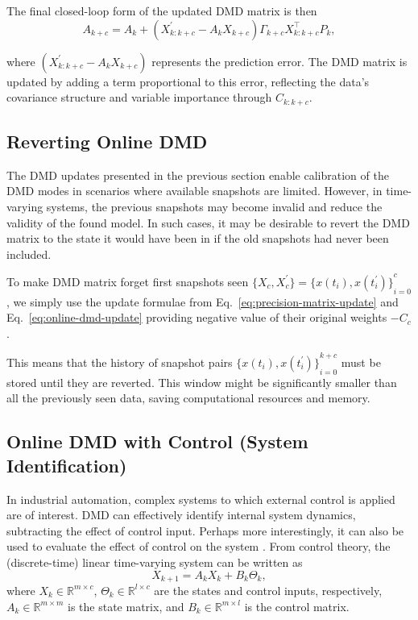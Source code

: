 The final closed-loop form of the updated DMD matrix is then
\begin{equation}\label{eq:online-dmd-update}
    A_{k+c} = A_k + (X^\prime_{k : k+c} - A_k X_{k+c}) \Gamma_{k+c} X_{k : k+c}^\top P_k,
\end{equation}

where \((X^\prime_{k : k+c} - A_k X_{k+c})\) represents the prediction error. The DMD matrix is updated by adding a term proportional to this error, reflecting the data's covariance structure and variable importance through \(C_{k: k + c}\).

\subsection{Reverting Online DMD}
The DMD updates presented in the previous section enable calibration of the DMD modes in scenarios where available snapshots are limited. However, in time-varying systems, the previous snapshots may become invalid and reduce the validity of the found model. In such cases, it may be desirable to revert the DMD matrix to the state it would have been in if the old snapshots had never been included.

To make DMD matrix forget first snapshots seen \( \{X_{c}, X^\prime_{c}\} = {\{x(t_i), x(t_i^\prime )\}}^c_{i=0}\), we simply use the update formulae from Eq.~\eqref{eq:precision-matrix-update} and Eq.~\eqref{eq:online-dmd-update} providing negative value of their original weights \(-C_{c}\).

This means that the history of snapshot pairs \({\{x(t_i), x(t_i^\prime )\}}^{k+c}_{i=0}\) must be stored until they are reverted. This window might be significantly smaller than all the previously seen data, saving computational resources and memory.


\subsection{Online DMD with Control (System Identification)}
In industrial automation, complex systems to which external control is applied are of interest. DMD can effectively identify internal system dynamics, subtracting the effect of control input. Perhaps more interestingly, it can also be used to evaluate the effect of control on the system \citep{Proctor2016}. From control theory, the (discrete-time) linear time-varying system can be written as
\begin{equation}\label{eq:linear-system}
    X_{k+1} = A_k X_{k} + B_k \Theta_{k},
\end{equation}
where \(X_k \in \mathbb{R}^{m \times c}\), \(\Theta_k \in \mathbb{R}^{l \times c}\) are the states and control inputs, respectively, \(A_k \in \mathbb{R}^{m \times m}\) is the state matrix, and \(B_k \in \mathbb{R}^{m \times l}\) is the control matrix.

